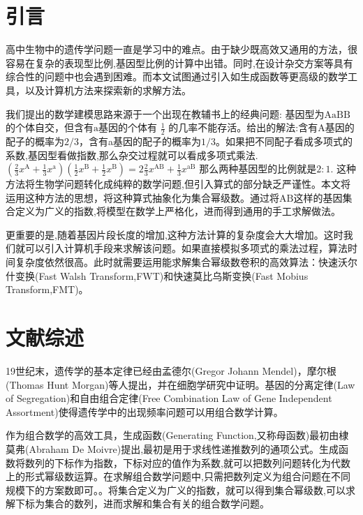 \documentclass[12pt]{article} %
\begin{document}
\newpage

\tableofcontents %

\newpage

\section{引言}

高中生物中的遗传学问题一直是学习中的难点。由于缺少既高效又通用的方法，很容易在复杂的表现型比例,基因型比例的计算中出错。同时,在设计杂交方案等具有综合性的问题中也会遇到困难。而本文试图通过引入如生成函数等更高级的数学工具，以及计算机方法来探索新的求解方法。

我们提出的数学建模思路来源于一个出现在教辅书上的经典问题\cite{蔡雪燕2009浅谈高中生物概念教学}: 基因型为$\text{AaBB}$的个体自交，但含有$\text{a}$基因的个体有 $\frac{1}{2} $ 的几率不能存活。给出的解法\cite{张克芳2013浅析高中生物遗传学习题的解析技巧}:含有A基因的配子的概率为$2/3$，含有a基因的配子的概率为$1/3$。如果把不同配子看成多项式的系数,基因型看做指数,那么杂交过程就可以看成多项式乘法. 
$(\frac{2}{3}x^{\text{A}}+\frac{1}{3} x^{\text{a}})(\frac{1}{2}x^{\text{B}}+\frac{1}{2}x^{\text{B}})=2\frac{2}{3}x^{\text{AB}}+\frac{1}{3}x^{\text{aB}}$ 那么两种基因型的比例就是$2:1$. 这种方法将生物学问题转化成纯粹的数学问题,但引入算式的部分缺乏严谨性。本文将运用这种方法的思想，将这种算式抽象化为集合幂级数。通过将$\text{AB}$这样的基因集合定义为广义的指数,将模型在数学上严格化，进而得到通用的手工求解做法。

更重要的是,随着基因片段长度的增加,这种方法计算的复杂度会大大增加。这时我们就可以引入计算机手段来求解该问题。如果直接模拟多项式的乘法过程，算法时间复杂度依然很高。此时就需要运用能求解集合幂级数卷积的高效算法：快速沃尔什变换(Fast Walsh Transform,FWT)和快速莫比乌斯变换(Fast Mobius Transform,FMT)。


\section{文献综述}

19世纪末，遗传学的基本定律已经由孟德尔(Gregor Johann Mendel)，摩尔根(Thomas Hunt Morgan)等人提出，并在细胞学研究中证明。基因的分离定律(Law of Segregation)和自由组合定律(Free Combination Law of Gene Independent Assortment)使得遗传学中的出现频率问题可以用组合数学计算。\cite{2009陈阅增普通生物学}

作为组合数学的高效工具，生成函数(Generating Function,又称母函数)最初由棣莫弗(Abraham De Moivre)提出,最初是用于求线性递推数列的通项公式。\cite{knuth2005art}生成函数将数列的下标作为指数，下标对应的值作为系数,就可以把数列问题转化为代数上的形式幂级数运算。在求解组合数学问题中,只需把数列定义为组合问题在不同规模下的方案数即可。\cite{graham1989concrete}。将集合定义为广义的指数，就可以得到集合幂级数,可以求解下标为集合的数列，进而求解和集合有关的组合数学问题。
\end{document}
